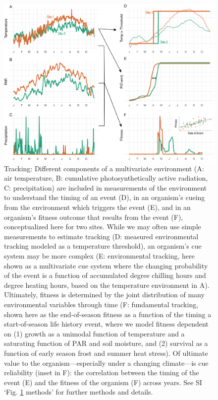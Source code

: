 \documentclass[11pt,letterpaper]{article}
\begin{document}
\begin{figure}[h!]
\centering
\includegraphics[width=1\textwidth]{..//..//..//R/graphs/conceptual/Fig_ConceptTrackwarrows.png}
\caption{Tracking: Different components of a multivariate environment (A: air temperature, B: cumulative photosynthetically active radiation, C: precipitation) are included in measurements of the environment to understand the timing of an event (D), in an organism's cueing from the environment which triggers the event (E), and in an organism's fitness outcome that results from the event (F), conceptualized here for two sites. While we may often use simple measurements to estimate tracking (D: measured environmental tracking modeled as a temperature threshold), an organism's cue system may be more complex (E: environmental tracking, here shown as a multivariate cue system where the changing probability of the event is a function of accumulated degree chilling hours and degree heating hours, based on the temperature environment in A). Ultimately, fitness is determined by the joint distribution of many environmental variables through time (F: fundamental tracking, shown here as the end-of-season fitness as a function of the timing a start-of-season life history event, where we model fitness dependent on (1) growth as a unimodal function of temperature and a saturating function of PAR and soil moisture, and (2) survival as a function of early season frost and summer heat stress). Of ultimate value to the organism---especially under a changing climate---is cue reliability (inset in F): the correlation between the timing of the event (E) and the fitness of the organism (F) across years. See SI `Fig. \ref{fig:defineET} methods' for further methods and details.} 
 \label{fig:defineET}
\end{figure}
\end{document}
